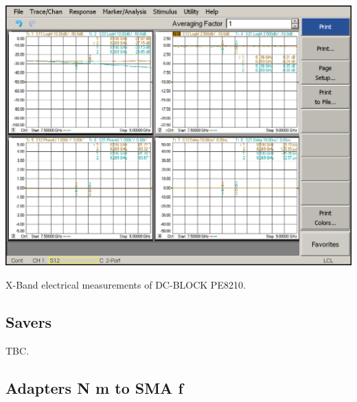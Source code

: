 \begin{table}[H]
	\centering
	\includegraphics[width=0.8\linewidth]{figuras/measures/DCB1.01.png}
	\caption{X-Band electrical measurements of DC-BLOCK PE8210.}
	\label{fig:DC-BLOCK-SMA-XB}
\end{table}

\subsection{Savers}

TBC.




\subsection{Adapters N m to SMA f}

